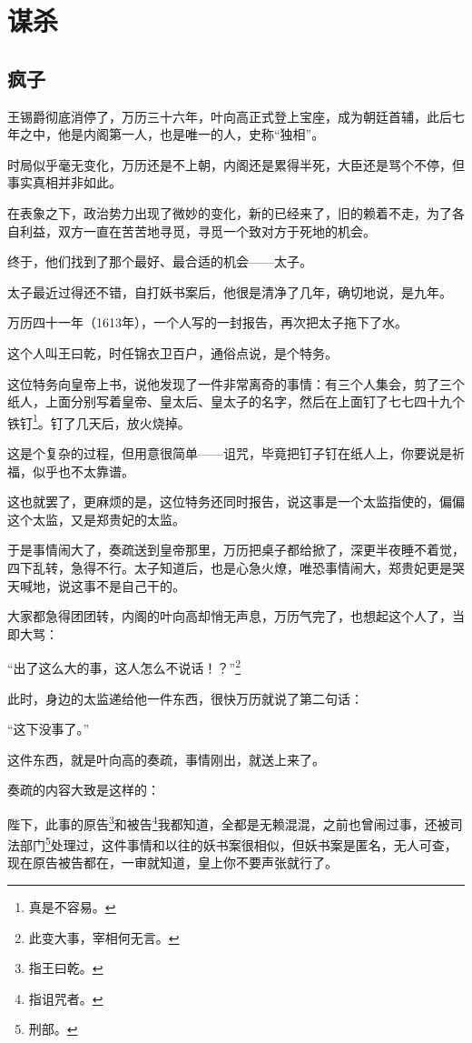 \section{谋杀}
\ifnum{}
	\begin{multicols}{\theparacolNo}
\fi
\subsection{疯子}
王锡爵彻底消停了，万历三十六年，叶向高正式登上宝座，成为朝廷首辅，此后七年之中，他是内阁第一人，也是唯一的人，史称“独相”。

时局似乎毫无变化，万历还是不上朝，内阁还是累得半死，大臣还是骂个不停，但事实真相并非如此。

在表象之下，政治势力出现了微妙的变化，新的已经来了，旧的赖着不走，为了各自利益，双方一直在苦苦地寻觅，寻觅一个致对方于死地的机会。

终于，他们找到了那个最好、最合适的机会——太子。

太子最近过得还不错，自打妖书案后，他很是清净了几年，确切地说，是九年。

万历四十一年（1613年），一个人写的一封报告，再次把太子拖下了水。

这个人叫王曰乾，时任锦衣卫百户，通俗点说，是个特务。

这位特务向皇帝上书，说他发现了一件非常离奇的事情：有三个人集会，剪了三个纸人，上面分别写着皇帝、皇太后、皇太子的名字，然后在上面钉了七七四十九个铁钉\footnote{真是不容易。}。钉了几天后，放火烧掉。

这是个复杂的过程，但用意很简单——诅咒，毕竟把钉子钉在纸人上，你要说是祈福，似乎也不太靠谱。

这也就罢了，更麻烦的是，这位特务还同时报告，说这事是一个太监指使的，偏偏这个太监，又是郑贵妃的太监。

于是事情闹大了，奏疏送到皇帝那里，万历把桌子都给掀了，深更半夜睡不着觉，四下乱转，急得不行。太子知道后，也是心急火燎，唯恐事情闹大，郑贵妃更是哭天喊地，说这事不是自己干的。

大家都急得团团转，内阁的叶向高却悄无声息，万历气完了，也想起这个人了，当即大骂：

“出了这么大的事，这人怎么不说话！？”\footnote{此变大事，宰相何无言。}

此时，身边的太监递给他一件东西，很快万历就说了第二句话：

“这下没事了。”

这件东西，就是叶向高的奏疏，事情刚出，就送上来了。

奏疏的内容大致是这样的：

陛下，此事的原告\footnote{指王曰乾。}和被告\footnote{指诅咒者。}我都知道，全都是无赖混混，之前也曾闹过事，还被司法部门\footnote{刑部。}处理过，这件事情和以往的妖书案很相似，但妖书案是匿名，无人可查，现在原告被告都在，一审就知道，皇上你不要声张就行了。


\end{multicols}
